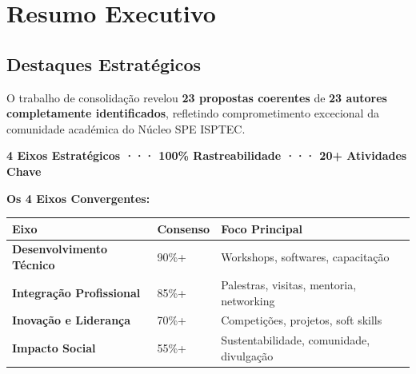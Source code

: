 \documentclass[12pt,a4paper,oneside]{article}
\begin{document}
\newpage

\setcounter{page}{1}
\tableofcontents

\newpage

\section*{Resumo Executivo}

\subsection*{Destaques Estratégicos}

O trabalho de consolidação revelou \textbf{23 propostas coerentes} de \textbf{23 autores completamente identificados}, refletindo comprometimento excecional da comunidade académica do Núcleo SPE ISPTEC.

\vspace{0.8cm}

\begin{center}
\colorbox{caixa-azul}{%
  \begin{minipage}{0.8\textwidth}
    \centering
    \Large\textbf{\color{spe-primary}
      4 Eixos Estratégicos ··· 100\% Rastreabilidade ··· 20+ Atividades Chave
    }
  \end{minipage}%
}
\end{center}

\vspace{1.2cm}

\noindent\textbf{\color{spe-secondary}Os 4 Eixos Convergentes:}

\vspace{0.6cm}

\begin{tabular}{|p{4cm}|p{3cm}|p{4cm}|}
\hline
\textbf{\color{spe-primary}Eixo} & \textbf{\color{spe-primary}Consenso} & \textbf{\color{spe-primary}Foco Principal} \\
\hline
\cellcolor{caixa-azul}\textbf{Desenvolvimento Técnico} & 90\%+ & Workshops, softwares, capacitação \\
\hline
\cellcolor{caixa-verde}\textbf{Integração Profissional} & 85\%+ & Palestras, visitas, mentoria, networking \\
\hline
\cellcolor{caixa-amarelo}\textbf{Inovação e Liderança} & 70\%+ & Competições, projetos, soft skills \\
\hline
\cellcolor{spe-light}\textbf{Impacto Social} & 55\%+ & Sustentabilidade, comunidade, divulgação \\
\hline
\end{tabular}
\end{document}
